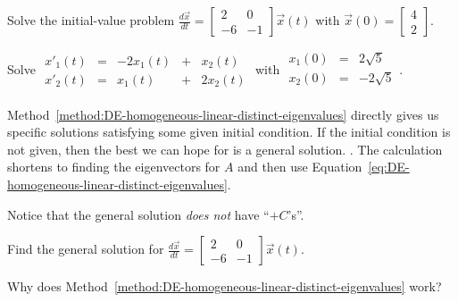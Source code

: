 \documentclass[../main.tex]{subfiles}
\begin{document}
\begin{example}
  Solve the initial-value problem \( \frac{d\vec{x}}{dt} = \begin{bmatrix} 2   & 0  \\ -6 & -1 \end{bmatrix} \vec{x}(t) \) with \(\vec{x}(0) = \begin{bmatrix} 4 \\ 2 \end{bmatrix}\).

\end{example}
\clearpage

\begin{example}
  Solve 
  \(
  \begin{array}{rcrcr}
    x'_{1}(t) &=& -2 x_{1}(t) &+&  x_{2}(t) \\
    x'_{2}(t) &=&    x_{1}(t) &+& 2x_{2}(t)
  \end{array}
  \) with \(
  \begin{array}{rcr}
    x_{1}(0) &=&  2 \sqrt{5} \\
    x_{2}(0) &=& -2 \sqrt{5} \\
  \end{array}
  \).
\end{example}
\clearpage


\faStar{} Method~\ref{method:DE-homogeneous-linear-distinct-eigenvalues} directly gives us specific solutions satisfying some given initial condition.  If the initial condition is not given, then the best we can hope for is a general solution.  .  The calculation shortens to finding the eigenvectors for \(A\) and then use Equation~\ref{eq:DE-homogeneous-linear-distinct-eigenvalues}.

Notice that the general solution \emph{does not} have ``\(+C\)'s''.


\begin{example}
  Find the general solution for \( \frac{d\vec{x}}{dt} = \begin{bmatrix} 2   & 0  \\ -6 & -1 \end{bmatrix} \vec{x}(t) \).

\end{example}


Why does Method~\ref{method:DE-homogeneous-linear-distinct-eigenvalues} work?
\end{document}
